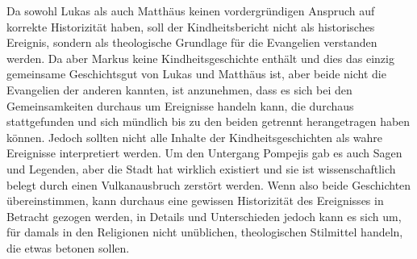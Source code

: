 Da sowohl Lukas als auch Matthäus keinen vordergründigen Anspruch auf korrekte Historizität haben, soll der Kindheitsbericht nicht als historisches Ereignis, sondern als theologische Grundlage für die Evangelien verstanden werden. Da aber Markus keine Kindheitsgeschichte enthält und dies das einzig gemeinsame Geschichtsgut von Lukas und Matthäus ist, aber beide nicht die Evangelien der anderen kannten, ist anzunehmen, dass es sich bei den Gemeinsamkeiten durchaus um Ereignisse handeln kann, die durchaus stattgefunden und sich mündlich bis zu den beiden getrennt herangetragen haben können. Jedoch sollten nicht alle Inhalte der Kindheitsgeschichten als wahre Ereignisse interpretiert werden. Um den Untergang Pompejis gab es auch Sagen und Legenden, aber die Stadt hat wirklich existiert und sie ist wissenschaftlich belegt durch einen Vulkanausbruch zerstört werden. Wenn also beide Geschichten übereinstimmen, kann durchaus eine gewissen Historizität des Ereignisses in Betracht gezogen werden, in Details und Unterschieden jedoch kann es sich um, für damals in den Religionen nicht unüblichen, theologischen Stilmittel handeln, die etwas betonen sollen.

